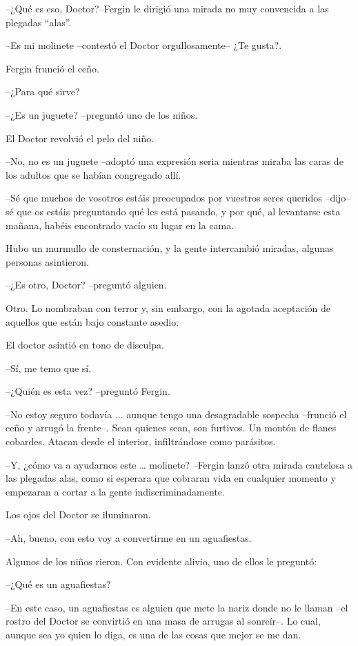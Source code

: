 --¿Qué es eso, Doctor?--Fergin le dirigió una mirada no muy convencida a las plegadas ``alas''.

--Es mi molinete --contestó el Doctor orgullosamente-- ¿Te gusta?.

Fergin frunció el ceño. 

--¿Para qué sirve?

--¿Es un juguete? --preguntó uno de los niños.

El Doctor revolvió el pelo del niño.

--No, no es un juguete --adoptó una expresión seria mientras miraba las caras de los adultos que se habían congregado allí.

--Sé que muchos de vosotros estáis preocupados por vuestros seres queridos --dijo-- sé que os estáis preguntando qué les está pasando, y por qué, al levantarse esta mañana, habéis encontrado vacío su lugar en la cama.

Hubo un murmullo de consternación, y la gente intercambió miradas, algunas personas asintieron.

--¿Es otro, Doctor? --preguntó alguien.

Otro. Lo nombraban con terror y, sin embargo, con la agotada aceptación de aquellos que están bajo constante asedio.

El doctor asintió en tono de disculpa. 

--Sí, me temo que sí.

--¿Quién es esta vez? --preguntó Fergin.

--No estoy seguro todavía ... aunque tengo una desagradable sospecha --frunció el ceño y arrugó la frente--. Sean quienes sean, son furtivos. Un montón de flanes cobardes. Atacan desde el interior, infiltrándose como parásitos.

--Y, ¿cómo va a ayudarnos este … molinete? --Fergin lanzó otra mirada cautelosa a las plegadas alas, como si esperara que cobraran vida en cualquier momento y empezaran a cortar a la gente indiscriminadamente.

Los ojos del Doctor se iluminaron. 

--Ah, bueno, con esto voy a convertirme en un aguafiestas.

Algunos de los niños rieron. Con evidente alivio, uno de ellos le preguntó: 

--¿Qué es un aguafiestas?

--En este caso, un aguafiestas es alguien que mete la nariz donde no le llaman --el rostro del Doctor se convirtió en una masa de arrugas al sonreír--. Lo cual, aunque sea yo quien lo diga, es una de las cosas que mejor se me dan.



